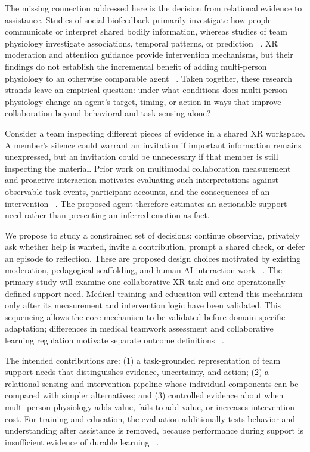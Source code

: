 The missing connection addressed here is the decision from relational evidence to assistance. Studies of social biofeedback primarily investigate how people communicate or interpret shared bodily information, whereas studies of team physiology investigate associations, temporal patterns, or prediction ~\cite{p38,p46,p49,p52}. XR moderation and attention guidance provide intervention mechanisms, but their findings do not establish the incremental benefit of adding multi-person physiology to an otherwise comparable agent ~\cite{p34,p70}. Taken together, these research strands leave an empirical question: under what conditions does multi-person physiology change an agent's target, timing, or action in ways that improve collaboration beyond behavioral and task sensing alone?

Consider a team inspecting different pieces of evidence in a shared XR workspace. A member's silence could warrant an invitation if important information remains unexpressed, but an invitation could be unnecessary if that member is still inspecting the material. Prior work on multimodal collaboration measurement and proactive interaction motivates evaluating such interpretations against observable task events, participant accounts, and the consequences of an intervention ~\cite{p57,speaker,expect}. The proposed agent therefore estimates an actionable support need rather than presenting an inferred emotion as fact.

We propose to study a constrained set of decisions: continue observing, privately ask whether help is wanted, invite a contribution, prompt a shared check, or defer an episode to reflection. These are proposed design choices motivated by existing moderation, pedagogical scaffolding, and human-AI interaction work ~\cite{p70,p27,p3}. The primary study will examine one collaborative XR task and one operationally defined support need. Medical training and education will extend this mechanism only after its measurement and intervention logic have been validated. This sequencing allows the core mechanism to be validated before domain-specific adaptation; differences in medical teamwork assessment and collaborative learning regulation motivate separate outcome definitions ~\cite{p66,p29,p51}.

The intended contributions are: (1) a task-grounded representation of team support needs that distinguishes evidence, uncertainty, and action; (2) a relational sensing and intervention pipeline whose individual components can be compared with simpler alternatives; and (3) controlled evidence about when multi-person physiology adds value, fails to add value, or increases intervention cost. For training and education, the evaluation additionally tests behavior and understanding after assistance is removed, because performance during support is insufficient evidence of durable learning ~\cite{p62}.
